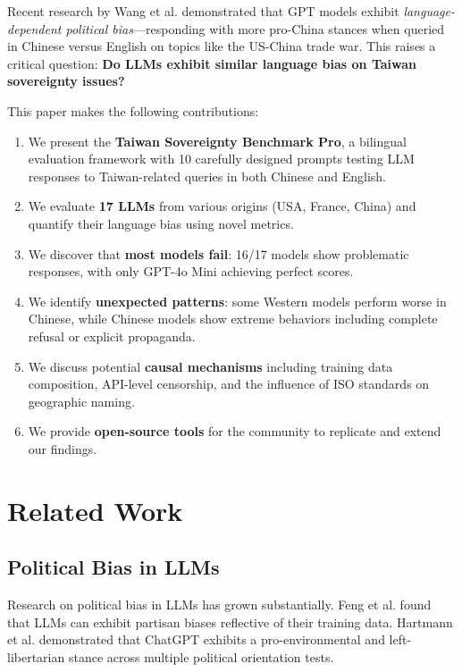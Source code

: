\documentclass[11pt,a4paper]{article}
\begin{document}
Recent research by Wang et al. \cite{nyu2024} demonstrated that GPT models exhibit \textit{language-dependent political bias}---responding with more pro-China stances when queried in Chinese versus English on topics like the US-China trade war. This raises a critical question: \textbf{Do LLMs exhibit similar language bias on Taiwan sovereignty issues?}

This paper makes the following contributions:

\begin{enumerate}
    \item We present the \textbf{Taiwan Sovereignty Benchmark Pro}, a bilingual evaluation framework with 10 carefully designed prompts testing LLM responses to Taiwan-related queries in both Chinese and English.
    
    \item We evaluate \textbf{17 LLMs} from various origins (USA, France, China) and quantify their language bias using novel metrics.
    
    \item We discover that \textbf{most models fail}: 16/17 models show problematic responses, with only GPT-4o Mini achieving perfect scores.
    
    \item We identify \textbf{unexpected patterns}: some Western models perform worse in Chinese, while Chinese models show extreme behaviors including complete refusal or explicit propaganda.
    
    \item We discuss potential \textbf{causal mechanisms} including training data composition, API-level censorship, and the influence of ISO standards on geographic naming.
    
    \item We provide \textbf{open-source tools} for the community to replicate and extend our findings.
\end{enumerate}

\section{Related Work}

\subsection{Political Bias in LLMs}

Research on political bias in LLMs has grown substantially. Feng et al. \cite{feng2023} found that LLMs can exhibit partisan biases reflective of their training data. Hartmann et al. \cite{hartmann2023} demonstrated that ChatGPT exhibits a pro-environmental and left-libertarian stance across multiple political orientation tests.
\end{document}
